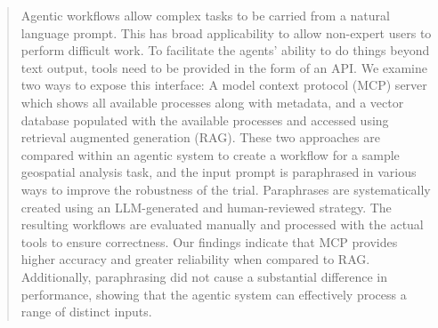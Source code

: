 \begin{abstract}
Agentic workflows allow complex tasks to be carried from a natural language prompt. This has
broad applicability to allow non-expert users to perform difficult work. To facilitate the
agents' ability to do things beyond text output, tools need to be provided in the form of an
API. We examine two ways to expose this interface: A model context protocol (MCP) server which
shows all available processes along with metadata, and a vector database populated with the
available processes and accessed using retrieval augmented generation (RAG). These two
approaches are compared within an agentic system to create a workflow for a sample geospatial
analysis task, and the input prompt is paraphrased in various ways to improve the robustness of
the trial. Paraphrases are systematically created using an LLM-generated and human-reviewed
strategy. The resulting workflows are evaluated manually and processed with the actual tools to
ensure correctness. Our findings indicate that MCP provides higher accuracy and greater
reliability when compared to RAG. Additionally, paraphrasing did not cause a substantial
difference in performance, showing that the agentic system can effectively process a range of
distinct inputs.
\end{abstract}
